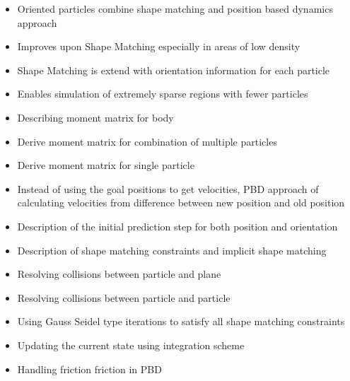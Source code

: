 \begin{itemize}
\item Oriented particles combine shape matching and position based dynamics approach
\item Improves upon Shape Matching especially in areas of low density
\item Shape Matching is extend with orientation information for each particle
\item Enables simulation of extremely sparse regions with fewer particles
\item Describing moment matrix for body
\item Derive moment matrix for combination of multiple particles
\item Derive moment matrix for single particle
\item Instead of using the goal positions to get velocities, PBD approach of calculating velocities from difference between new position and old position
\item Description of the initial prediction step for both position and orientation
\item Description of shape matching constraints and implicit shape matching
\item Resolving collisions between particle and plane
\item Resolving collisions between particle and particle
\item Using Gauss Seidel type iterations to satisfy all shape matching constraints
\item Updating the current state using integration scheme
\item Handling friction friction in PBD
\end{itemize}
